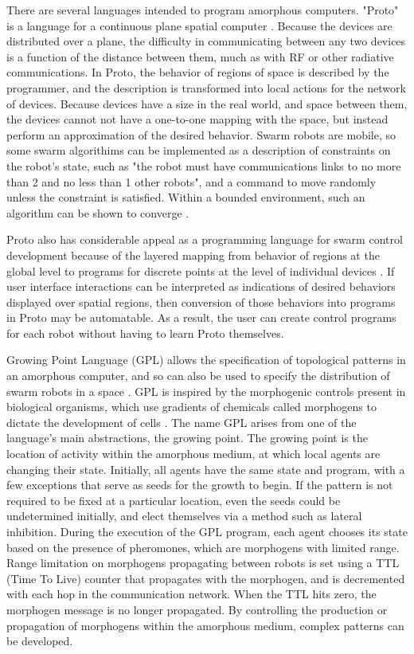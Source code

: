 \documentclass[]{article}
\begin{document}
There are several languages intended to program amorphous computers. 
"Proto" is a language for a continuous plane spatial computer \cite{correll2009ad}.
Because the devices are distributed over a plane, the difficulty in communicating between any two devices is a function of the distance between them, much as with RF or other radiative communications.
In Proto, the behavior of regions of space is described by the programmer, and the description is transformed into local actions for the network of devices. 
Because devices have a size in the real world, and space between them, the devices cannot not have a one-to-one mapping with the space, but instead perform an approximation of the desired behavior. 
Swarm robots are mobile, so some swarm algorithims can be implemented as a description of constraints on the robot's state, such as "the robot must have communications links to no more than 2 and no less than 1 other robots", and a command to move randomly unless the constraint is satisfied. 
Within a bounded environment, such an algorithm can be shown to converge \cite{correll2009ad}. 

Proto also has considerable appeal as a programming language for swarm control development because of the layered mapping from behavior of regions at the global level to programs for discrete points at the level of individual devices \cite{beal2006infrastructure}. 
If user interface interactions can be interpreted as indications of desired behaviors displayed over spatial regions, then conversion of those behaviors into programs in Proto may be automatable. 
As a result, the user can create control programs for each robot without having to learn Proto themselves.  

Growing Point Language (GPL) allows the specification of topological patterns in an amorphous computer, and so can also be used to specify the distribution of swarm robots in a space \cite{nagpal2004engineering}. 
GPL is inspired by the morphogenic controls present in biological organisms, which use gradients of chemicals called morphogens to dictate the development of cells \cite{turing1952chemical}.
The name GPL arises from one of the language's main abstractions, the growing point. 
The growing point is the location of activity within the amorphous medium, at which local agents are changing their state. 
Initially, all agents have the same state and program, with a few exceptions that serve as seeds for the growth to begin. 
If the pattern is not required to be fixed at a particular location, even the seeds could be undetermined initially, and elect themselves via a method such as lateral inhibition. 
During the execution of the GPL program, each agent chooses its state based on the presence of pheromones, which are morphogens with limited range. 
Range limitation on morphogens propagating between robots is set using a TTL (Time To Live) counter that propagates with the morphogen, and is decremented with each hop in the communication network. 
When the TTL hits zero, the morphogen message is no longer propagated. 
By controlling the production or propagation of morphogens within the amorphous medium, complex patterns can be developed. 
\end{document}
